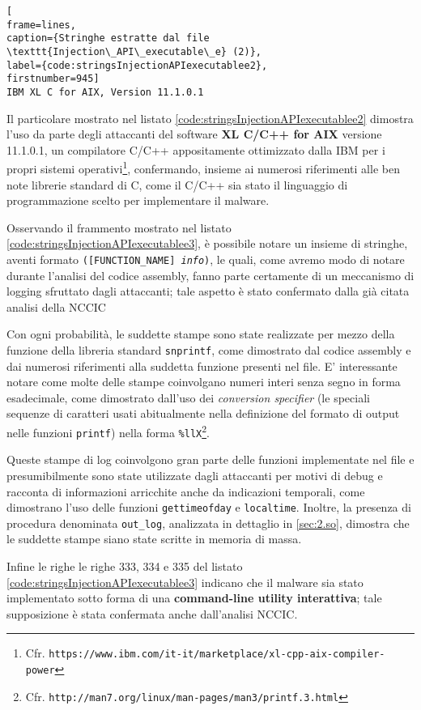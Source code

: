 \documentclass[10pt,a4paper, titlepage]{report}
\begin{document}
\begin{lstlisting}[
frame=lines, 
caption={Stringhe estratte dal file \texttt{Injection\_API\_executable\_e} (2)}, 
label={code:stringsInjectionAPIexecutablee2},
firstnumber=945]
IBM XL C for AIX, Version 11.1.0.1
\end{lstlisting}

Il particolare mostrato nel listato \ref{code:stringsInjectionAPIexecutablee2} dimostra l'uso da parte degli attaccanti del software \textbf{XL C/C++ for AIX} versione 11.1.0.1, un compilatore C/C++ appositamente ottimizzato dalla IBM per i propri sistemi operativi\footnote{Cfr. \texttt{https://www.ibm.com/it-it/marketplace/xl-cpp-aix-compiler-power}}, confermando, insieme ai numerosi riferimenti alle ben note librerie standard di C, come il C/C++ sia stato il linguaggio di programmazione scelto per implementare il malware.

Osservando il frammento mostrato nel listato \ref{code:stringsInjectionAPIexecutablee3}, è possibile notare un insieme di stringhe, aventi formato \texttt{([FUNCTION\_NAME] \textit{info})}, le quali, come avremo modo di notare durante l'analisi del codice assembly, fanno parte certamente di un meccanismo di logging sfruttato dagli attaccanti; tale aspetto è stato confermato dalla già citata analisi della NCCIC

Con ogni probabilità, le suddette stampe sono state realizzate per mezzo della funzione della libreria standard \texttt{snprintf}, come dimostrato dal codice assembly e dai numerosi riferimenti alla suddetta funzione presenti nel file. E' interessante notare come molte delle stampe coinvolgano numeri interi senza segno in forma esadecimale, come dimostrato dall'uso dei \textit{conversion specifier} (le speciali sequenze di caratteri usati abitualmente nella definizione del formato di output nelle funzioni \texttt{printf}) nella forma \texttt{\%llX}\footnote{Cfr. \texttt{http://man7.org/linux/man-pages/man3/printf.3.html}}.

Queste stampe di log coinvolgono gran parte delle funzioni implementate nel file e presumibilmente sono state utilizzate dagli attaccanti per motivi di debug e racconta di informazioni arricchite anche da indicazioni temporali, come dimostrano l'uso delle funzioni \texttt{gettimeofday} e \texttt{localtime}. Inoltre, la presenza di procedura denominata \texttt{out\_log}, analizzata in dettaglio in \ref{sec:2.so}, dimostra che le suddette stampe siano state scritte in memoria di massa.

Infine le righe le righe 333, 334 e 335 del listato \ref{code:stringsInjectionAPIexecutablee3} indicano che il malware sia stato implementato sotto forma di una \textbf{command-line utility interattiva}; tale supposizione è stata confermata anche dall'analisi NCCIC.
\end{document}
